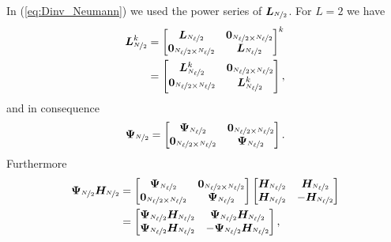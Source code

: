 In (\ref{eq:Dinv_Neumann}) we used the power series of $\bm{L}_{\nicefrac{N}{2}}$. For $L=2$ we have
\begin{align}
    \bm{L}_{\nicefrac{N}{2}}^k & =
    \begin{bmatrix}
        \bm{L}_{\nicefrac{N_\ell}{2}} & \bm{0}_{\nicefrac{N_\ell}{2} \times \nicefrac{N_\ell}{2}} \\
        \bm{0}_{\nicefrac{N_\ell}{2} \times \nicefrac{N_\ell}{2}} & \bm{L}_{\nicefrac{N_\ell}{2}}
    \end{bmatrix}^k \\
    & =
    \begin{bmatrix}
        \bm{L}_{\nicefrac{N_\ell}{2}}^k & \bm{0}_{\nicefrac{N_\ell}{2} \times \nicefrac{N_\ell}{2}} \\
        \bm{0}_{\nicefrac{N_\ell}{2} \times \nicefrac{N_\ell}{2}} & \bm{L}_{\nicefrac{N_\ell}{2}}^k
    \end{bmatrix},
\end{align}
and in consequence
\begin{equation}
    \bm{\Psi}_{\nicefrac{N}{2}} =
    \begin{bmatrix}
        \bm{\Psi}_{\nicefrac{N_\ell}{2}} & \bm{0}_{\nicefrac{N_\ell}{2} \times \nicefrac{N_\ell}{2}} \\
        \bm{0}_{\nicefrac{N_\ell}{2} \times \nicefrac{N_\ell}{2}} & \bm{\Psi}_{\nicefrac{N_\ell}{2}}
    \end{bmatrix}.
\end{equation}
Furthermore
\begin{align}
    \bm{\Psi}_{\nicefrac{N}{2}}\bm{H_}{\nicefrac{N}{2}}
    & =
    \begin{bmatrix}
        \bm{\Psi}_{\nicefrac{N_\ell}{2}} & \bm{0}_{\nicefrac{N_\ell}{2} \times \nicefrac{N_\ell}{2}} \\
        \bm{0}_{\nicefrac{N_\ell}{2} \times \nicefrac{N_\ell}{2}} & \bm{\Psi}_{\nicefrac{N_\ell}{2}}
    \end{bmatrix}
    \begin{bmatrix}
        \bm{H_}{\nicefrac{N_\ell}{2}} & \bm{H_}{\nicefrac{N_\ell}{2}} \\
        \bm{H_}{\nicefrac{N_\ell}{2}} & -\bm{H_}{\nicefrac{N_\ell}{2}}
    \end{bmatrix} \\
    & =
    \begin{bmatrix}
        \bm{\Psi}_{\nicefrac{N_\ell}{2}} \bm{H_}{\nicefrac{N_\ell}{2}} & \bm{\Psi}_{\nicefrac{N_\ell}{2}} \bm{H_}{\nicefrac{N_\ell}{2}} \\
        \bm{\Psi}_{\nicefrac{N_\ell}{2}} \bm{H_}{\nicefrac{N_\ell}{2}} & -\bm{\Psi}_{\nicefrac{N_\ell}{2}}\bm{H_}{\nicefrac{N_\ell}{2}}
    \end{bmatrix},
\end{align}
